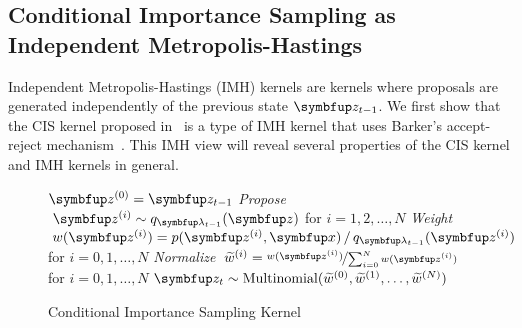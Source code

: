 %
\subsection{Conditional Importance Sampling as Independent Metropolis-Hastings}\label{section:cis_imh}
Independent Metropolis-Hastings (IMH) kernels are kernels where proposals are generated independently of the previous state \(\vz_{t-1}\).
We first show that the CIS kernel proposed in~\citep{NEURIPS2020_b2070693} is a type of IMH kernel that uses Barker's accept-reject mechanism~\citep{barker_monte_1965}.
This IMH view will reveal several properties of the CIS kernel and IMH kernels in general.

\begin{figure}
  \small
  \begin{algorithm2e}[H]
    \DontPrintSemicolon
    \SetAlgoLined
    \(\vz^{(0)} = \vz_{t-1}\) \;
    \textit{Propose} \(\;\vz^{(i)} \sim q_{\vlambda_{t-1}}(\vz)\) for \(i = 1, 2,\ldots, N\) \;
    \textit{Weight} \(\;w(\vz^{(i)}) = p(\vz^{(i)},\vx) \,/\, q_{\vlambda_{t-1}}(\vz^{(i)}) \) for \(i = 0, 1,\ldots, N\)\;
    \textit{Normalize} \(\;\widetilde{w}^{(i)} = \nicefrac{w(\vz^{(i)})}{ \sum^{N}_{i=0} w(\vz^{(i)}) }\) for \(i = 0, 1,\ldots, N\)\;
    \(\vz_{t} \sim \mathrm{Multinomial}(\widetilde{w}^{(0)}, \widetilde{w}^{(1)}, \ldots, \widetilde{w}^{(N)}) \)\;
    \caption{Conditional Importance Sampling Kernel}\label{alg:cis}
  \end{algorithm2e}
  \vspace{-0.15in}
\end{figure}
%
\vspace{-0.1in}

